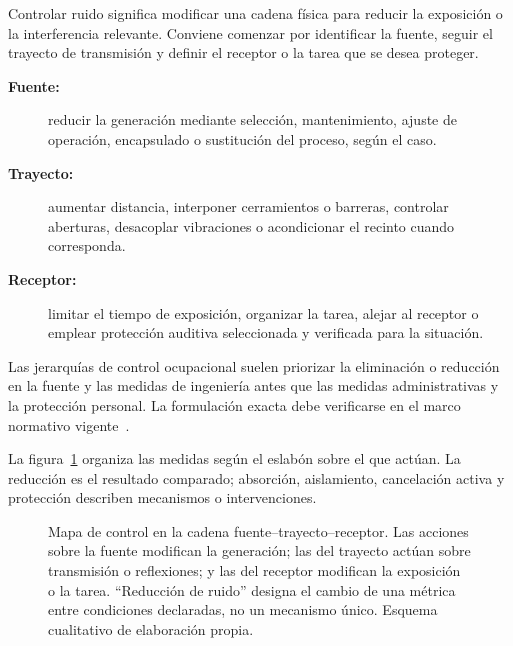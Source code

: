Controlar ruido significa modificar una cadena física para reducir la
exposición o la interferencia relevante. Conviene comenzar por identificar la
fuente, seguir el trayecto de transmisión y definir el receptor o la tarea que
se desea proteger.

\begin{description}
    \item[\textbf{Fuente:}] reducir la generación mediante selección,
    mantenimiento, ajuste de operación, encapsulado o sustitución del proceso,
    según el caso.
    \item[\textbf{Trayecto:}] aumentar distancia, interponer cerramientos o
    barreras, controlar aberturas, desacoplar vibraciones o acondicionar el
    recinto cuando corresponda.
    \item[\textbf{Receptor:}] limitar el tiempo de exposición, organizar la
    tarea, alejar al receptor o emplear protección auditiva seleccionada y
    verificada para la situación.
\end{description}

Las jerarquías de control ocupacional suelen priorizar la eliminación
o reducción en la fuente y las medidas de ingeniería antes que las medidas
administrativas y la protección personal. La formulación exacta debe
verificarse en el marco normativo vigente~\cite{nioshHierarchy2024}.

La figura~\ref{fig:u10-control-ftr} organiza las medidas según el eslabón sobre
el que actúan. La reducción es el resultado comparado; absorción, aislamiento,
cancelación activa y protección describen mecanismos o intervenciones.

\begin{figure}[htbp]
    \centering
    
    \caption{Mapa de control en la cadena fuente--trayecto--receptor. Las
    acciones sobre la fuente modifican la generación; las del trayecto actúan
    sobre transmisión o reflexiones; y las del receptor modifican la
    exposición o la tarea. ``Reducción de ruido'' designa el cambio de una
    métrica entre condiciones declaradas, no un mecanismo único. Esquema
    cualitativo de elaboración propia.}
    \label{fig:u10-control-ftr}
\end{figure}

